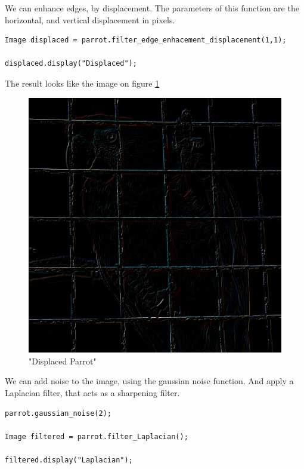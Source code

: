\documentclass[a4paper]{article}
\begin{document}
We can enhance edges, by displacement. The parameters of this function are the horizontal, and vertical displacement in pixels.

\begin{lstlisting}
Image displaced = parrot.filter_edge_enhacement_displacement(1,1);
	
displaced.display("Displaced");
\end{lstlisting}

The result looks like the image on figure \ref{displaced}

\begin{figure}

\centering
\includegraphics[scale=0.5]{./.Multimedia/parrot_displaced.jpg}

\caption{"Displaced Parrot"}
\label{displaced}

\end{figure}

We can add noise to the image, using the gaussian noise function. And apply a Laplacian filter, that acts as a sharpening filter.

\begin{lstlisting}
parrot.gaussian_noise(2);
	
Image filtered = parrot.filter_Laplacian();
	
filtered.display("Laplacian");
\end{lstlisting}
\end{document}
